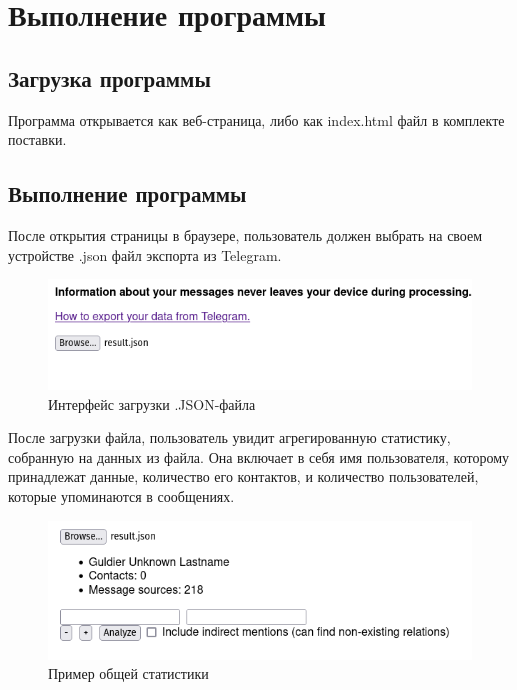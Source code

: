 \section{Выполнение программы}

\subsection{Загрузка программы}

Программа открывается как веб-страница, либо как index.html файл в комплекте поставки.

\subsection{Выполнение программы}

После открытия страницы в браузере, пользователь должен выбрать на своем устройстве .json файл экспорта из Telegram.

\begin{figure}[h!]
    \includegraphics[width=\linewidth]{ro/img/upload.png}
    \caption{Интерфейс загрузки .JSON-файла}
    \label{fig:upload}
\end{figure}


После загрузки файла, пользователь увидит агрегированную статистику, собранную на данных из файла. 
Она включает в себя имя пользователя, которому принадлежат данные, количество его контактов, и количество пользователей, которые упоминаются в сообщениях.

\begin{figure}[h!]
    \includegraphics[width=\linewidth]{ro/img/aggregate.png}
    \caption{Пример общей статистики}
    \label{fig:aggregate}
\end{figure}


